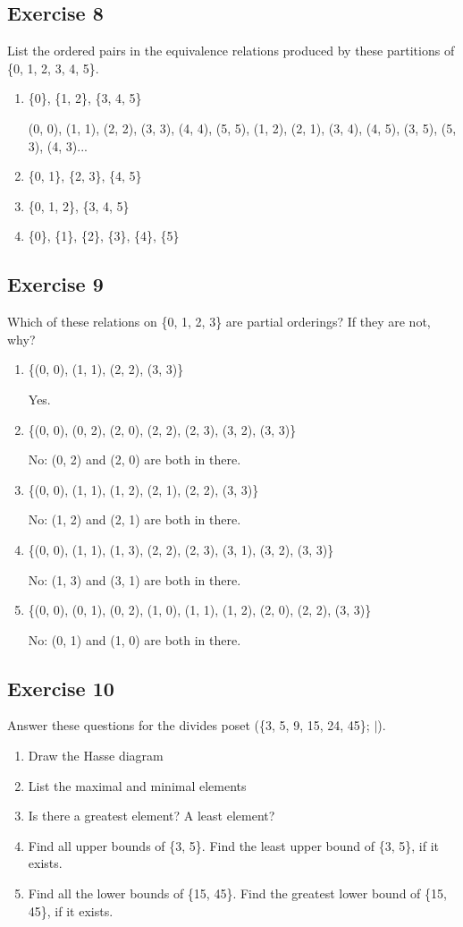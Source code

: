 \documentclass{article}
\newcommand\ssc[2][\DefaultOpt]{%
  \def\DefaultOpt{#2}%
  \subsection[#1]{#2}%
}
\newcommand{\balist}{\begin{enumerate}[label=\alph*.]}
\newcommand{\elist}{\end{enumerate}}
\newcommand{\bk}[1]{\{#1\}}
\begin{document}
\ssc{Exercise 8}{
List the ordered pairs in the equivalence relations produced by these partitions of \bk{0, 1, 2, 3, 4, 5}.

\balist
\item \bk{0}, \bk{1, 2}, \bk{3, 4, 5}

(0, 0), (1, 1), (2, 2), (3, 3), (4, 4), (5, 5), (1, 2), (2, 1), (3, 4), (4, 5), (3, 5), (5, 3), (4, 3)...

\item \bk{0, 1}, \bk{2, 3}, \bk{4, 5}
\item \bk{0, 1, 2}, \bk{3, 4, 5}
\item \bk{0}, \bk{1}, \bk{2}, \bk{3}, \bk{4}, \bk{5}
\elist
}

\ssc{Exercise 9}{

Which of these relations on \bk{0, 1, 2, 3} are partial orderings? If they are not, why?

\balist 
\item \bk{(0, 0), (1, 1), (2, 2), (3, 3)}

Yes.

\item \bk{(0, 0), (0, 2), (2, 0), (2, 2), (2, 3), (3, 2), (3, 3)}

No: (0, 2) and (2, 0) are both in there.

\item \bk{(0, 0), (1, 1), (1, 2), (2, 1), (2, 2), (3, 3)}

No: (1, 2) and (2, 1) are both in there.

\item \bk{(0, 0), (1, 1), (1, 3), (2, 2), (2, 3), (3, 1), (3, 2), (3, 3)}

No: (1, 3) and (3, 1) are both in there.

\item \bk{(0, 0), (0, 1), (0, 2), (1, 0), (1, 1), (1, 2), (2, 0), (2, 2), (3, 3)}

No: (0, 1) and (1, 0) are both in there.

\elist 
}

\ssc{Exercise 10}{

Answer these questions for the divides poset (\bk{3, 5, 9, 15, 24, 45}; $\mid$).
\balist
\item Draw the Hasse diagram
\item List the maximal and minimal elements
\item Is there a greatest element? A least element?
\item Find all upper bounds of \bk{3, 5}. Find the least upper bound of \bk{3, 5}, if it exists.
\item Find all the lower bounds of \bk{15, 45}. Find the greatest lower bound of \bk{15, 45}, if it exists.
\elist

}
\end{document}
